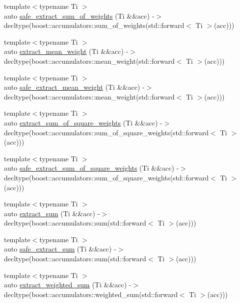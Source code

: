 \begin{DoxyCompactItemize}
\item 
{\footnotesize template$<$typename Ti $>$ }\\auto \hyperlink{namespaceIceBRG_afcbd6038c7fa0f33805d87f75e98f6b9}{safe\+\_\+extract\+\_\+sum\+\_\+of\+\_\+weights} (Ti \&\&acc) -\/$>$ decltype(boost\+::accumulators\+::sum\+\_\+of\+\_\+weights(std\+::forward$<$ Ti $>$(acc)))
\item 
{\footnotesize template$<$typename Ti $>$ }\\auto \hyperlink{namespaceIceBRG_a728019da879dc9500594414b56dc85bc}{extract\+\_\+mean\+\_\+weight} (Ti \&\&acc) -\/$>$ decltype(boost\+::accumulators\+::mean\+\_\+weight(std\+::forward$<$ Ti $>$(acc)))
\item 
{\footnotesize template$<$typename Ti $>$ }\\auto \hyperlink{namespaceIceBRG_a042bba7c8b44a6a7ca623bfe373b273f}{safe\+\_\+extract\+\_\+mean\+\_\+weight} (Ti \&\&acc) -\/$>$ decltype(boost\+::accumulators\+::mean\+\_\+weight(std\+::forward$<$ Ti $>$(acc)))
\item 
{\footnotesize template$<$typename Ti $>$ }\\auto \hyperlink{namespaceIceBRG_aea29007252f30bb20f0620f59b297603}{extract\+\_\+sum\+\_\+of\+\_\+square\+\_\+weights} (Ti \&\&acc) -\/$>$ decltype(boost\+::accumulators\+::sum\+\_\+of\+\_\+square\+\_\+weights(std\+::forward$<$ Ti $>$(acc)))
\item 
{\footnotesize template$<$typename Ti $>$ }\\auto \hyperlink{namespaceIceBRG_aa2d4cecfba45ec3ae1870783f5a04f63}{safe\+\_\+extract\+\_\+sum\+\_\+of\+\_\+square\+\_\+weights} (Ti \&\&acc) -\/$>$ decltype(boost\+::accumulators\+::sum\+\_\+of\+\_\+square\+\_\+weights(std\+::forward$<$ Ti $>$(acc)))
\item 
{\footnotesize template$<$typename Ti $>$ }\\auto \hyperlink{namespaceIceBRG_a40b1eb8685c7b8e5c159ace2976a59c0}{extract\+\_\+sum} (Ti \&\&acc) -\/$>$ decltype(boost\+::accumulators\+::sum(std\+::forward$<$ Ti $>$(acc)))
\item 
{\footnotesize template$<$typename Ti $>$ }\\auto \hyperlink{namespaceIceBRG_ad1e41f2a4d446c69e71e74c05b1408ed}{safe\+\_\+extract\+\_\+sum} (Ti \&\&acc) -\/$>$ decltype(boost\+::accumulators\+::sum(std\+::forward$<$ Ti $>$(acc)))
\item 
{\footnotesize template$<$typename Ti $>$ }\\auto \hyperlink{namespaceIceBRG_ab34cf70501400f6f066c9973c36fa32a}{extract\+\_\+weighted\+\_\+sum} (Ti \&\&acc) -\/$>$ decltype(boost\+::accumulators\+::weighted\+\_\+sum(std\+::forward$<$ Ti $>$(acc)))

\end{DoxyCompactItemize}
